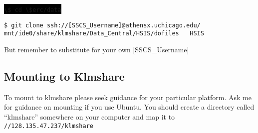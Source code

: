 \documentclass{article}
\newcommand{\inlineterminal}[1]{\colorbox{black}{\lstinline[basicstyle=\ttfamily\color{white}]|#1|}}
\begin{document}
	\vspace{0.5cm}
	\noindent \inlineterminal{\$ cd \$erc/data}

	\vspace{0.5cm}
	\begin{raggedright}
	\newbox{\mybox}
	\begin{lrbox}{\mybox}
	\begin{minipage}{\linewidth}
	\begin{lstlisting}[basicstyle=\small\ttfamily\color{white}]
$ git clone ssh://[SSCS_Username]@athensx.uchicago.edu/
mnt/ide0/share/klmshare/Data_Central/HSIS/dofiles   HSIS
	\end{lstlisting}
	\end{minipage}
	\end{lrbox}
	\colorbox{black}{\usebox{\mybox}}
		
	\end{raggedright}

	\vspace{0.5cm}
	\noindent But remember to substitute for your own [SSCS\_Username]

	\subsection*{Mounting to Klmshare} \label{sec:klmmap}
	To mount to klmshare please seek guidance for your particular platform.
	Ask me for guidance on mounting if you use Ubuntu. You should create a
	directory called ``klmshare'' somewhere on your computer and map it to
	\texttt{//128.135.47.237/klmshare}
\end{document}
